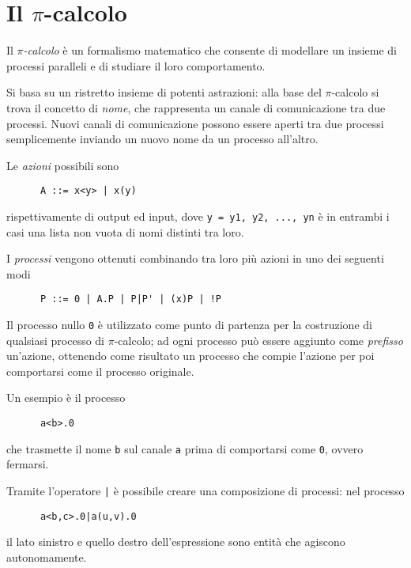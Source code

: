 \section{Il $\pi$-calcolo}

Il \emph{$\pi$-calcolo} \`e un formalismo matematico che consente di
modellare un insieme di processi paralleli e di studiare il loro
comportamento.

Si basa su un ristretto insieme di potenti astrazioni: alla base del
$\pi$-calcolo si trova il concetto di \emph{nome}, che rappresenta un
canale di comunicazione tra due processi. Nuovi canali di comunicazione
possono essere aperti tra due processi semplicemente inviando un nuovo
nome da un processo all'altro.

Le \emph{azioni} possibili sono

\begin{verbatim}
      A ::= x<y> | x(y)
\end{verbatim}

rispettivamente di output ed input, dove \verb!y = y1, y2, ..., yn! \`e
in entrambi i casi una lista non vuota di nomi distinti tra loro.

I \emph{processi} vengono ottenuti combinando tra loro pi\`u azioni in uno
dei seguenti modi

\begin{verbatim}
      P ::= 0 | A.P | P|P' | (x)P | !P
\end{verbatim}

Il processo nullo \verb.0. \`e utilizzato come punto di partenza per la
costruzione di qualsiasi processo di $\pi$-calcolo; ad ogni processo pu\`o
essere aggiunto come \emph{prefisso} un'azione, ottenendo come risultato un
processo che compie l'azione per poi comportarsi come il processo originale.

Un esempio \`e il processo

\begin{verbatim}
      a<b>.0
\end{verbatim}

che trasmette il nome \verb.b. sul canale \verb.a. prima di comportarsi come
\verb!0!, ovvero fermarsi.

Tramite l'operatore \verb.|. \`e possibile creare una composizione di
processi: nel processo

\begin{verbatim}
      a<b,c>.0|a(u,v).0
\end{verbatim}

il lato sinistro e quello destro dell'espressione sono entit\`a che agiscono
autonomamente.

